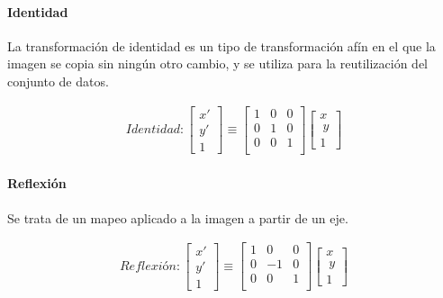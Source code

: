 \paragraph{Identidad}

La transformación de identidad es un tipo de transformación afín en el que la imagen se copia sin ningún otro cambio, y se utiliza para  
la reutilización del conjunto de datos.


\begin{gather}
	Identidad:
	\begin{bmatrix} x' \\ y' \\ 1 \end{bmatrix}
	\equiv
	 \begin{bmatrix}
	  1 & 0 & 0 \\
	  0 & 1 & 0 \\
	  0 & 0 & 1 \\
	  \end{bmatrix}
	  \begin{bmatrix} x \\\ y \\ 1 \end{bmatrix}
\end{gather}


\paragraph{Reflexión}

Se trata de un mapeo aplicado a la imagen a partir de un eje.


\begin{gather}
	Reflexión:
	\begin{bmatrix} x' \\ y' \\ 1 \end{bmatrix}
	\equiv
	 \begin{bmatrix}
	  1 & 0 & 0 \\
	  0 & -1 & 0 \\
	  0 & 0 & 1 \\
	  \end{bmatrix}
	  \begin{bmatrix} x \\\ y \\ 1 \end{bmatrix}
\end{gather}


